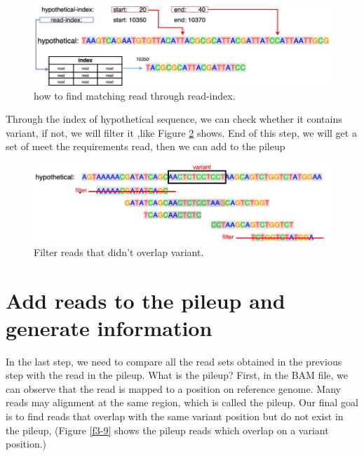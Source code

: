 \begin{figure}[H]
    \centering
    \includegraphics[width=1\columnwidth]{body/image/3-7.png}
    \captionsetup{labelfont=bf}
    \renewcommand{\baselinestretch}{1.0}
    \vspace{-1cm}
    \caption[read-index]{how to find matching read through read-index.}
    \label{f3-7}
\end{figure}

Through the index of hypothetical sequence, we can check whether it contains variant, if not, we will filter it ,like Figure \ref{f3-8} shows. End of this step, we will get a set of meet the requirements read, then we can add to the pileup

\vspace{1cm}
\begin{figure}[H]
    \centering
    \includegraphics[width=1\columnwidth]{body/image/3-8.png}
    \captionsetup{labelfont=bf}
    \renewcommand{\baselinestretch}{1.0}
    \vspace{-1cm}
    \caption[Filter reads]{Filter reads that didn't overlap variant.}
    \label{f3-8}
\end{figure}

\section{Add reads to the pileup and generate information}
In the last step, we need to compare all the read sets obtained in the previous step with the read in the pileup. What is the pileup? First, in the BAM file, we can observe that the read is mapped to a position on reference genome. Many reads may alignment at the same region, which is called the pileup. Our final goal is to find reads that overlap with the same variant position but do not exist in the pileup, (Figure \ref{f3-9} shows the pileup reads which overlap on a variant position.)

